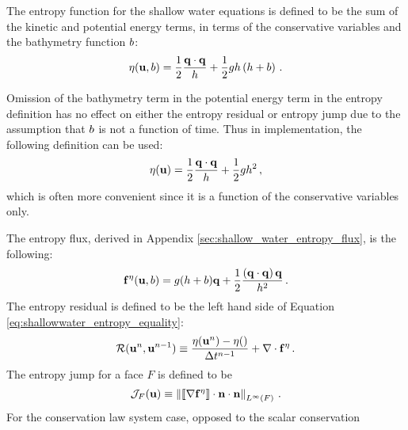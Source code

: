 The entropy function for the shallow water equations is defined to be
the sum of the kinetic and potential energy terms, in terms of the
conservative variables and the bathymetry function $b$:
\begin{equation}
  \eta(\mathbf{u},b)
  = \frac{1}{2}\frac{\mathbf{q}\cdot\mathbf{q}}
  {h} + \frac{1}{2}gh\left(h+b\right)
  \,.
\end{equation}
\begin{remark}
Omission of the bathymetry term in the potential energy
term in the entropy definition has no effect on either the entropy
residual or entropy jump due to the assumption that $b$ is
not a function of time. Thus in implementation, the following definition
can be used:
\begin{equation}
  \eta(\mathbf{u})
  = \frac{1}{2}\frac{\mathbf{q}\cdot\mathbf{q}}
  {h} + \frac{1}{2}gh^2
  \,,
\end{equation}
which is often more convenient since it is a function of the conservative
variables only.
\end{remark}
The entropy flux, derived in Appendix \ref{sec:shallow_water_entropy_flux}, is the
following:
\begin{equation}
  \mathbf{f}^\eta(\mathbf{u},b)
  = g(h + b)\mathbf{q}
  + \frac{1}{2}\frac{\left(\mathbf{q}\cdot\mathbf{q}\right)\mathbf{q}} 
  {h^2}
  \,.
\end{equation}
The entropy residual is defined to be the left hand side of 
Equation \eqref{eq:shallowwater_entropy_equality}:
\begin{equation}
  \mathcal{R}(\mathbf{u}^n, \mathbf{u}^{n-1})
    \equiv \frac{\eta(\mathbf{u}^n) - \eta()}{\Delta t^{n-1}}
    + \nabla\cdot\mathbf{f}^\eta
  \,.
\end{equation}
The entropy jump for a face $F$ is defined to be
\begin{equation}
  \mathcal{J}_F(\mathbf{u})
  \equiv \left\|
    \left\llbracket\nabla\mathbf{f}^\eta\right\rrbracket
    \cdot\mathbf{n}\cdot\mathbf{n}
  \right\|_{L^\infty(F)} \,.
\end{equation}
For the conservation law system case, opposed to the scalar conservation
